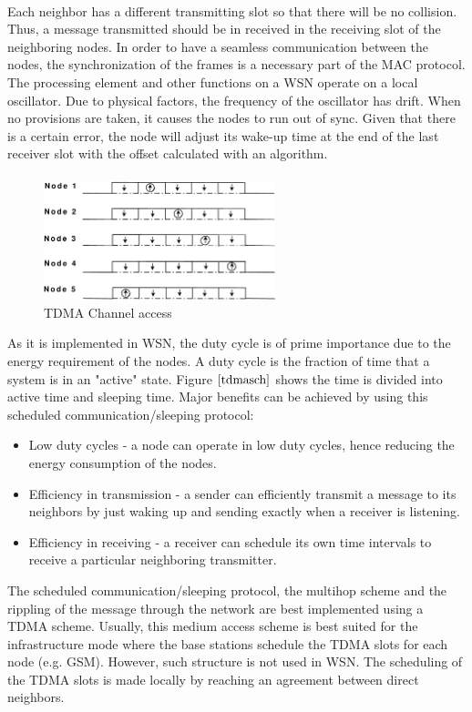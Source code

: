 \documentclass[a4paper,10pt]{report}
\begin{document}
\paragraph*{}
Each neighbor has a different transmitting slot so that there will be no collision. Thus, a message transmitted should be in received in the receiving slot of the neighboring nodes. In order to have a seamless communication between the nodes, the synchronization of the frames is a necessary part of the MAC protocol. The processing element and other functions on a WSN operate on a local oscillator. Due to physical factors, the frequency of the oscillator has drift. When no provisions are taken, it causes the nodes to run out of sync. Given that there is a certain error, the node will adjust its wake-up time at the end of the last receiver slot with the offset calculated with an algorithm. \paragraph*{}
\begin{figure}
\centering
\includegraphics[width=0.6\textwidth]{tdmaschedule}
\caption{TDMA Channel access} \label{tdmasch}
\end{figure}
As it is implemented in WSN, the duty cycle is of prime importance due to the energy requirement of the nodes. A duty cycle is the fraction of time that a system is in an "active" state. Figure $\ref{tdmasch}$ shows the time is divided into active time and sleeping time. Major benefits can be achieved
by using this scheduled communication/sleeping protocol:
\begin{itemize}
\item Low duty cycles - a node can operate in low duty cycles, hence reducing the energy consumption of the nodes.
\item Efficiency in transmission - a sender can efficiently transmit a message to its neighbors by just waking up and sending exactly when a receiver is listening.
\item Efficiency in receiving - a receiver can schedule its own time intervals to receive a particular neighboring transmitter.
\end{itemize}
The scheduled communication/sleeping protocol, the multihop scheme and the rippling of the message through the network are best implemented using a TDMA scheme. Usually, this medium access scheme is best suited for the infrastructure mode where the base stations schedule the TDMA slots for each node (e.g. GSM). However, such structure is not used in WSN. The scheduling of the TDMA slots is made locally by reaching an agreement between direct neighbors.
\end{document}
